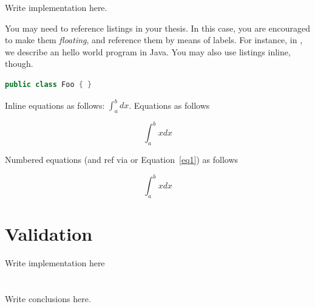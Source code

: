 \documentclass[12pt,a4paper,openright,twoside]{book}
\begin{document}
Write implementation here.



You may need to reference listings in your thesis.
%
In this case, you are encouraged to make them \emph{floating}, and reference them by means of labels.
%
For instance, in , we describe an hello world program in Java.
%
You may also use listings inline, though.
\begin{lstlisting}[language={java}]
public class Foo { }
\end{lstlisting}

Inline equations as follows: $\int_a^b dx$. Equations as follows

$$
\int_a^b xdx
$$

Numbered equations (and ref via  or Equation~\ref{eq1}) as follows

\begin{equation}
\label{eq1}
\int_a^b xdx
\end{equation}

\chapter{Validation} %
\label{chap:validation}

Write implementation here

\chapter{\conclusionsname}
\label{chap:conclusions}

Write conclusions here.





\end{document}
